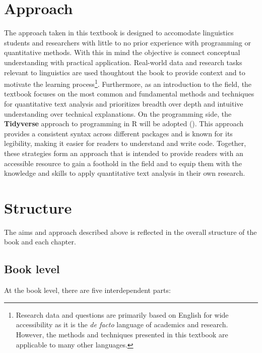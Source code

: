 \documentclass[
  letterpaper,
  krantz1]{latex/krantz-mod}
\theoremstyle{definition}
\theoremstyle{definition}
\theoremstyle{remark}
\begin{document}
\section*{Approach}\label{sec-preface-approach}


The approach taken in this textbook is designed to accomodate
linguistics students and researchers with little to no prior experience
with programming or quantitative methods. With this in mind the
objective is connect conceptual understanding with practical
application. Real-world data and research tasks relevant to linguistics
are used thoughtout the book to provide context and to motivate the
learning process\footnote{Research data and questions are primarily
  based on English for wide accessibility as it is the \emph{de facto}
  language of academics and research. However, the methods and
  techniques presented in this textbook are applicable to many other
  languages.}. Furthermore, as an introduction to the field, the
textbook focuses on the most common and fundamental methods and
techniques for quantitative text analysis and prioritizes breadth over
depth and intuitive understanding over technical explanations. On the
programming side, the
\textbf{Tidyverse} approach to
programming in R will be adopted (). This approach provides a consistent syntax across different
packages and is known for its legibility, making it easier for readers
to understand and write code. Together, these strategies form an
approach that is intended to provide readers with an accessible resource
to gain a foothold in the field and to equip them with the knowledge and
skills to apply quantitative text analysis in their own research.

\section*{Structure}\label{sec-preface-structure}


The aims and approach described above is reflected in the overall
structure of the book and each chapter.

\subsection*{Book level}\label{sec-preface-structure-book}

At the book level, there are five interdependent parts:
\end{document}
